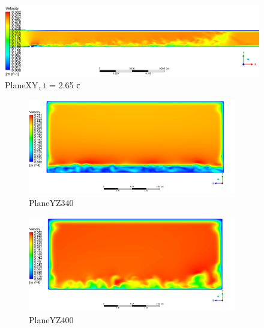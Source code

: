 \begin{figure}[H]
	\centering
	\includegraphics[width=1\linewidth]{../Assets/T265_Velocity_ContourXY}
	\caption{PlaneXY, t = 2.65 с}
	\label{fig:t265velocitycontourxy}
\end{figure}
\begin{figure}[H]
	\begin{subfigure}{.5\textwidth}
		\centering
		\includegraphics[width=1.1\linewidth]{../Assets/T265_Velocity_ContourYZ340}
		\caption{PlaneYZ340}
		\label{fig:T265VelocityContourYZ340}
	\end{subfigure}%
	\begin{subfigure}{.5\textwidth}
		\centering
		\includegraphics[width=1.1\linewidth]{../Assets/T265_Velocity_ContourYZ400}
		\caption{PlaneYZ400}
		\label{fig:T265VelocityContourYZ400}
	\end{subfigure}
	\\
	\begin{subfigure}{.5\textwidth}

\end{subfigure}
\end{figure}
